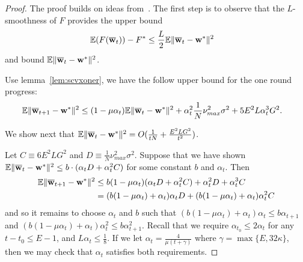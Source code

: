 \begin{proof}
	The proof builds on ideas from~\cite{li2019convergence}. The first step is to observe that the $L$-smoothness of $F$ provides
	the upper bound
	\begin{align*}
	\mathbb{E}(F({\overline{\mathbf{w}}}_{t}))-F^{\ast} & \leq\frac{L}{2}\mathbb{E}\|{\overline{\mathbf{w}}}_{t}-{\mathbf{w}}^{\ast}\|^{2}
	\end{align*}
	and bound $\mathbb{E}\|{\overline{\mathbf{w}}}_{t}-{\mathbf{w}}^{\ast}\|^{2}$. 
	
	Use lemma~\ref{lem:scvxoner}, we have the follow upper bound for the one round progress: 
	\begin{align*}
	\mathbb{E}\|{\overline{\mathbf{w}}}_{t+1}-{\mathbf{w}}^{\ast}\|^{2} & \leq(1-\mu\alpha_{t})\mathbb{E}\|{\overline{\mathbf{w}}}_{t}-{\mathbf{w}}^{\ast}\|^{2}+\alpha_{t}^{2}\frac{1}{N}\nu_{max}^{2}\sigma^{2}+5E^{2}L\alpha_{t}^{3}G^{2}.
	\end{align*}
	

	We show next that $\mathbb{E}\|{\overline{\mathbf{w}}}_{t}-{\mathbf{w}}^{\ast}\|^{2}=O(\frac{1}{tN}+\frac{E^{2}LG^{2}}{t^{2}})$. 
	
	Let $C\equiv6E^{2}LG^{2}$ and $D\equiv\frac{1}{N}\nu_{max}^{2}\sigma^{2}$.
	Suppose that we have shown $\mathbb{E}\|{\overline{\mathbf{w}}}_{t}-{\mathbf{w}}^{\ast}\|^{2}\leq b\cdot(\alpha_{t}D+\alpha_{t}^{2}C)$
	for some constant $b$ and $\alpha_{t}$. Then 
	\begin{align*}
	\mathbb{E}\|{\overline{\mathbf{w}}}_{t+1}-{\mathbf{w}}^{\ast}\|^{2} & \leq b(1-\mu\alpha_{t})(\alpha_{t}D+\alpha_{t}^{2}C)+\alpha_{t}^{2}D+\alpha_{t}^{3}C\\
	& =(b(1-\mu\alpha_{t})+\alpha_{t})\alpha_{t}D+(b(1-\mu\alpha_{t})+\alpha_{t})\alpha_{t}^{2}C
	\end{align*}
	and so it remains to choose $\alpha_{t}$ and $b$ such that $(b(1-\mu\alpha_{t})+\alpha_{t})\alpha_{t}\leq b\alpha_{t+1}$
	and $(b(1-\mu\alpha_{t})+\alpha_{t})\alpha_{t}^{2}\leq b\alpha_{t+1}^{2}$.
	Recall that we require $\alpha_{t_{0}}\leq2\alpha_{t}$ for any $t-t_{0}\leq E-1$,
	and $L\alpha_{t}\leq\frac{1}{8}$. If we let $\alpha_{t}=\frac{4}{\mu(t+\gamma)}$
	where $\gamma=\max\{E,32\kappa\}$, then we may check that $\alpha_{t}$
	satisfies both requirements. 
	

\end{proof}
